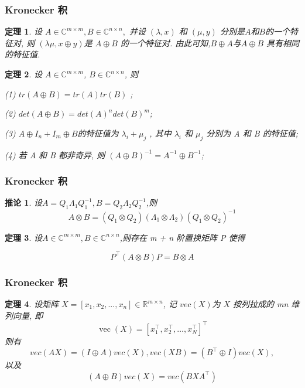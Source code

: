 \documentclass[notheorems,serif]{beamer}
\newcommand{\hei}[1]{{\HEI#1}}
\newtheorem{theorem}{\hei{定理}}
\newtheorem{corollary}{\hei{推论}}
\begin{document}
\begin{frame}
\frametitle{Kronecker 积}
\begin{theorem}
	设 $A \in \mathbb{C}^{m \times m}, B \in \mathbb{C}^{n \times n},$ 并设 $(\lambda, x)$ 和 $(\mu, y)$ 分别是$ A $和$ B $的一个特征对, 则 $(\lambda \mu, x \oplus y) $是 $A \oplus B$ 的一个特征对. 由此可知,$ B \oplus A $与$A \oplus B$ 具有相同的特征值.	
\end{theorem}
\begin{theorem}
	设 $A \in \mathbb{C}^{m \times m}$, $B \in \mathbb{C}^{n \times n}$, 则
	
	(1) $tr(A \oplus B) = tr(A)tr(B)$ ;
	
	(2) $det(A \oplus B) = det(A)^n det(B)^m $;
	
	(3) $A \oplus I_n + I_m \oplus B $的特征值为 $\lambda_i + \mu_j$ , 其中 $\lambda_i$ 和 $\mu_j$ 分别为 A 和 B 的特征值;
	
	(4) 若 A 和 B 都非奇异, 则 $(A \oplus B)^{-1} = A^{-1} \oplus B^{-1}$;	
\end{theorem}
\end{frame}

\begin{frame}
\frametitle{Kronecker 积}
\begin{corollary}
	设$A=Q_{1} \Lambda_{1} Q_{1}^{-1}, B=Q_{2} \Lambda_{2} Q_{2}^{-1}$,则
	$$
	A \otimes B=\left(Q_{1} \otimes Q_{2}\right)\left(\Lambda_{1} \otimes \Lambda_{2}\right)\left(Q_{1} \otimes Q_{2}\right)^{-1}
	$$	
\end{corollary}

\begin{theorem}
	设$A \in \mathbb{C}^{m \times m}, B \in \mathbb{C}^{n \times n}$,则存在 m + n 阶置换矩阵 P 使得
	
	$$
	P^{\top}(A \otimes B) P=B \otimes A
	$$	
\end{theorem}
\end{frame}

\begin{frame}
\frametitle{Kronecker 积}
\begin{theorem}
	设矩阵 $X = [x_1, x_2, . . . , x_n] \in \mathbb{R}^{
		m \times n}$, 记 $vec(X)$为 $X$ 按列拉成的
	mn 维列向量, 即
	$$
	\operatorname{vec}(X)=\left[x_{1}^{\top}, x_{2}^{\top}, \ldots, x_{N}^{\top}\right]^{\top}
	$$
	则有
	$$vec(AX) = (I \oplus A)vec(X), vec(XB) = (B^{\top}\oplus I)vec(X),$$
	以及
	$$(A \oplus B)vec(X) = vec(BXA^{\top}
	)$$
\end{theorem}
\end{frame}
\end{document}
